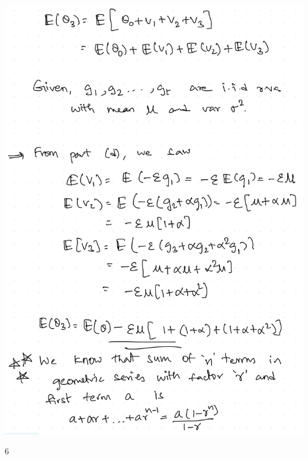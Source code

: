 \documentclass{article}
\renewcommand{\bf}[1]{\textbf{{#1}}}
\newcommand{\ul}[1]{\underline{{#1}}}
\newcommand{\tbu}{\bf{\ul{}}}
\begin{document}
\begin{minipage}{2.6in}
\includegraphics[scale=0.22]{mr5e2.png}
\end{minipage}


\tbu{6}
\end{document}
